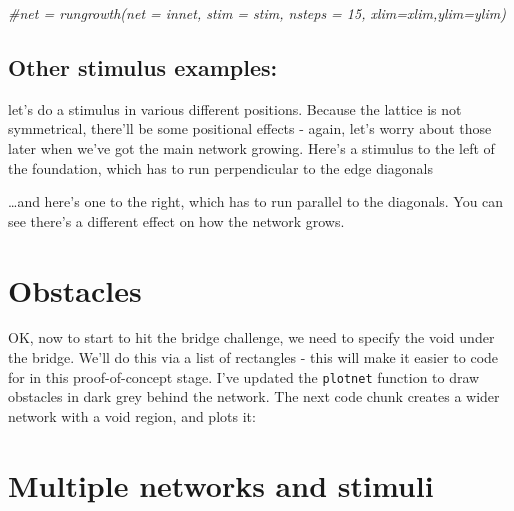 \documentclass[]{article}
\newenvironment{Shaded}{\begin{snugshade}}{\end{snugshade}}
\newcommand{\CommentTok}[1]{\textcolor[rgb]{0.56,0.35,0.01}{\textit{#1}}}
\begin{document}

\begin{Shaded}
\begin{Highlighting}[]
\CommentTok{#net = rungrowth(net = innet, stim = stim, nsteps = 15, xlim=xlim,ylim=ylim)}
\end{Highlighting}
\end{Shaded}

\hypertarget{other-stimulus-examples}{%
\subsection{Other stimulus examples:}\label{other-stimulus-examples}}

let's do a stimulus in various different positions. Because the lattice
is not symmetrical, there'll be some positional effects - again, let's
worry about those later when we've got the main network growing. Here's
a stimulus to the left of the foundation, which has to run perpendicular
to the edge diagonals


\ldots{}and here's one to the right, which has to run parallel to the
diagonals. You can see there's a different effect on how the network
grows.


\hypertarget{obstacles}{%
\section{Obstacles}\label{obstacles}}

OK, now to start to hit the bridge challenge, we need to specify the
void under the bridge. We'll do this via a list of rectangles - this
will make it easier to code for in this proof-of-concept stage. I've
updated the \texttt{plotnet} function to draw obstacles in dark grey
behind the network. The next code chunk creates a wider network with a
void region, and plots it:



\hypertarget{multiple-networks-and-stimuli}{%
\section{Multiple networks and
stimuli}\label{multiple-networks-and-stimuli}}
\end{document}

